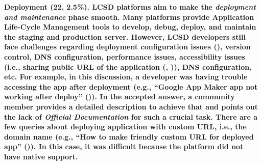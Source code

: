 \bf{Deployment (22, 2.5\%).} LCSD platforms aim to make the \textit{deployment and maintenance} phase smooth. Many platforms provide Application Life-Cycle Management tools to develop, debug, deploy, and maintain the staging and production server. However, LCSD developers still face challenges regarding deployment configuration issues (), version control, DNS configuration, performance issues, accessibility issues (i.e., sharing public URL of the application (, )), DNS configuration, etc. For example, in this discussion, a developer was having trouble accessing the app after deployment (e.g., ``Google App Maker app not working after deploy'' ()). In the accepted answer, a community member provides a detailed description to achieve that and points out the lack of \textit{Official Documentation} for such a crucial task. There are a few queries about deploying application with custom URL, i.e., the domain name (e.g., ``How to make friendly custom URL for deployed app'' ()). In this case, it was difficult because the platform did not have native support. 








